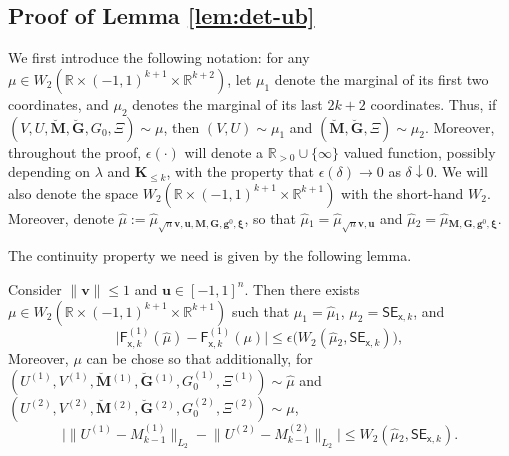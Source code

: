 \documentclass[]{article}
\def\sx{{\mathsf x}}
\def\bv{{\boldsymbol V}}
\def\bM{{\boldsymbol M}}
\def\bu{{\boldsymbol u}}
\def\bg{{\boldsymbol g}}
\def\bv{{\boldsymbol v}}
\def\bxi{{\boldsymbol \xi}}
\def\reals{{\mathbb R}}
\def\bG{{\boldsymbol G}}
\def\bv{{\boldsymbol v}}
\def\bu{{\boldsymbol u}}
\def\bg{{\boldsymbol g}}
\def\bK{\boldsymbol{K}}
\def\muhat{\widehat{\mu}{}}
\def\sF{\mathsf{F}}
\def\brevebM{\breve{\boldsymbol{M}}{}}
\def\brevebG{\breve{\boldsymbol{G}}{}}
\def\SE{\mathsf{SE}}
\begin{document}
\subsection{Proof of Lemma \ref{lem:det-ub}}
\label{sec:proof-lem-det-ub}

We first introduce the following notation:
for any $\mu \in W_2(\reals \times (-1,1)^{k+1} \times \reals^{k+2})$, 
let $\mu_1$ denote the marginal of its first two coordinates, and $\mu_2$ denotes the marginal of its last $2k+2$ coordinates.
Thus, if $(V,U,\brevebM,\brevebG,G_0,\Xi) \sim \mu$, 
then $(V,U) \sim \mu_1$ and $(\brevebM,\brevebG,\Xi) \sim \mu_2$.
Moreover, throughout the proof, $\epsilon(\cdot)$ will denote a $\reals_{>0} \cup \{ \infty \}$ valued function, possibly depending on $\lambda$ and $\bK_{\leq k}$,
with the property that $\epsilon(\delta) \rightarrow 0$ as $\delta \downarrow 0$.
We will also denote the space $W_2(\reals \times (-1,1)^{k+1} \times \reals^{k+1})$ with the short-hand $W_2$.
Moreover, denote $\muhat := \muhat_{\sqrt{n}\bv,\bu,\bM,\bG,\bg^0,\bxi}$,
so that $\muhat_1 = \muhat_{\sqrt{n}\bv,\bu}$ and $\muhat_2 = \muhat_{\bM,\bG,\bg^0,\bxi}$.

The continuity property we need is given by the following lemma.

\begin{lemma}\label{lem:cL-cont}
    Consider $\| \bv \| \leq 1$ and $ \bu \in [-1,1]^n$.
    Then there exists $\mu \in W_2(\reals \times (-1,1)^{k+1} \times \reals^{k+1})$ 
    such that $\mu_1 = \muhat_1$, $\mu_2 = \SE_{\sx,k}$, and
    \begin{equation}
        \big|
            \sF^{(1)}_{\sx,k}(\muhat) - \sF^{(1)}_{\sx,k}(\mu)
        \big|
            \leq 
            \epsilon\big( W_2(\muhat_2,\SE_{\sx,k}) \big),
    \end{equation}
    Moreover, $\mu$ can be chose so that additionally, for $(U^{(1)},V^{(1)},\brevebM^{(1)},\brevebG^{(1)},G_0^{(1)},\Xi^{(1)}) \sim \muhat$ and
    $(U^{(2)},V^{(2)},\allowbreak\brevebM^{(2)},\allowbreak\brevebG^{(2)},\allowbreak G_0^{(2)},\Xi^{(2)}) \sim \mu$,
    \begin{equation}
        \big|
            \big\| U^{(1)} - M_{k-1}^{(1)}\big\|_{L_2} 
            -
            \big\| U^{(2)} - M_{k-1}^{(2)}\big\|_{L_2} 
        \big| \leq W_2(\muhat_2,\SE_{\sx,k}).
    \end{equation}
\end{lemma}
\end{document}
